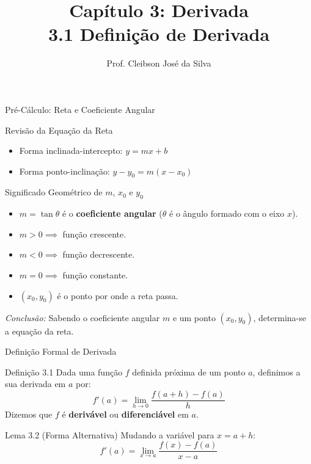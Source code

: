 \documentclass[10pt, aspectratio=169]{beamer}
\title[Definição de Derivada]{Capítulo 3: Derivada\\ \Large 3.1 Definição de Derivada}
\author[Prof. Cleibson]{Prof. Cleibson José da Silva}
\institute[IFPE]{Instituto Federal de Pernambuco -- Campus Caruaru}
\date{}
\begin{document}
\begin{frame}
  \titlepage
\end{frame}

\begin{frame}{Pré-Cálculo: Reta e Coeficiente Angular}
  \begin{block}{Revisão da Equação da Reta}
    \begin{itemize}
      \item Forma inclinada-intercepto: $y = mx + b$
      \item Forma ponto-inclinação: $y - y_0 = m(x - x_0)$
    \end{itemize}
  \end{block}

  \begin{alertblock}{Significado Geométrico de $m$, $x_0$ e $y_0$}
    \begin{itemize}
      \item $m = \tan \theta$ é o \textbf{coeficiente angular} ($\theta$ é o ângulo formado com o eixo $x$).
      \item $m > 0 \implies$ função crescente.
      \item $m < 0 \implies$ função decrescente.
      \item $m = 0 \implies$ função constante.
      \item $(x_0, y_0)$ é o ponto por onde a reta passa.
    \end{itemize}
  \end{alertblock}
  \textit{Conclusão:} Sabendo o coeficiente angular $m$ e um ponto $(x_0, y_0)$, determina-se a equação da reta.
\end{frame}

\begin{frame}{Definição Formal de Derivada}
  \begin{block}{Definição 3.1}
    Dada uma função $f$ definida próxima de um ponto $a$, definimos a sua derivada em $a$ por:
    \[
      f'(a) = \lim_{h \to 0} \frac{f(a+h) - f(a)}{h}
    \]
    Dizemos que $f$ é \textbf{derivável} ou \textbf{diferenciável} em $a$.
  \end{block}

  \begin{exampleblock}{Lema 3.2 (Forma Alternativa)}
    Mudando a variável para $x = a + h$:
    \[
      f'(a) = \lim_{x \to a} \frac{f(x) - f(a)}{x - a}
    \]
  \end{exampleblock}
\end{frame}
\end{document}

